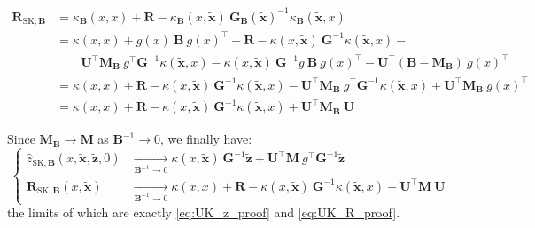 \begin{equation}
	\begin{aligned}
	\mathbf{R}_{\mathrm{SK},\mathbf{B}}&=\kappa_{\mathbf{B}}(x,x)+\mathbf{R}-\kappa_{\mathbf{B}}(x,\tilde{\mathbf{x}})\:\mathbf{G}_{\mathbf{B}}(\tilde{\mathbf{x}})^{-1}\kappa_{\mathbf{B}}\left(\tilde{\mathbf{x}},x\right)\\
	&=\kappa(x,x)+g(x)\:\mathbf{B}\:g(x)^\top+\mathbf{R}-\kappa(x,\tilde{\mathbf{x}})\:\mathbf{G}^{-1}\kappa(\tilde{\mathbf{x}},x)-\\
	&\qquad\mathbf{U}^\top \mathbf{M}_{\mathbf{B}}\:g^\top \mathbf{G}^{-1}\kappa(\tilde{\mathbf{x}},x)-\kappa(x,\tilde{\mathbf{x}})\:\mathbf{G}^{-1}g\:\mathbf{B}\:g(x)^\top-\mathbf{U}^\top(\mathbf{B}-\mathbf{M}_{\mathbf{B}})\:g(x)^\top\\
	&=\kappa(x,x)+\mathbf{R}-\kappa(x,\tilde{\mathbf{x}})\:\mathbf{G}^{-1}\kappa(\tilde{\mathbf{x}},x)-\mathbf{U}^\top \mathbf{M}_{\mathbf{B}}\:g^\top \mathbf{G}^{-1}\kappa(\tilde{\mathbf{x}},x)+\mathbf{U}^\top \mathbf{M}_{\mathbf{B}}\:g(x)^\top\\
	&=\kappa(x,x)+\mathbf{R}-\kappa(x,\tilde{\mathbf{x}})\:\mathbf{G}^{-1}\kappa(\tilde{\mathbf{x}},x)+\mathbf{U}^\top \mathbf{M}_{\mathbf{B}}\:\mathbf{U}
	\end{aligned}
\end{equation}

Since $\mathbf{M}_{\mathbf{B}}\to \mathbf{M}$ as $\mathbf{B}^{-1}\to0$, we finally have:
\begin{equation}
	\left\{\begin{aligned}
	\hat{z}_{\mathrm{SK},\mathbf{B}}(x,\tilde{\mathbf{x}},\tilde{\mathbf{z}},0)&\underset{\mathbf{B}^{-1}\to0}{\longrightarrow}\kappa(x,\tilde{\mathbf{x}})\:\mathbf{G}^{-1}\tilde{\mathbf{z}}+\mathbf{U}^\top \mathbf{M}\:g^\top \mathbf{G}^{-1}\tilde{\mathbf{z}}\\
	\mathbf{R}_{\mathrm{SK},\mathbf{B}}(x,\tilde{\mathbf{x}})&\underset{\mathbf{B}^{-1}\to0}{\longrightarrow}\kappa(x,x)+\mathbf{R}-\kappa(x,\tilde{\mathbf{x}})\:\mathbf{G}^{-1}\kappa(\tilde{\mathbf{x}},x)+\mathbf{U}^\top \mathbf{M}\:\mathbf{U}
	\end{aligned}\right.
\end{equation}
the limits of which are exactly \eqref{eq:UK_z_proof} and \eqref{eq:UK_R_proof}.

